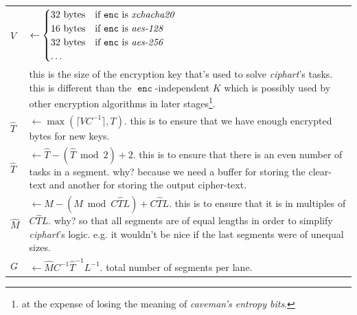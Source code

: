 \documentclass[twocolumn]{article}
\DeclareMathOperator{\enc}{\mathtt{enc}}
\DeclareMathOperator{\maxf}{max}
\begin{document}
\begin{tabularx}{\columnwidth}{lX}
    $V$ & $\gets \begin{cases}
                        32 \text{ bytes} & \text{if $\enc$ is
                                            \emph{xchacha20}}\\
                        16 \text{ bytes} & \text{if $\enc$ is
                            \emph{aes-128}}\\
                        32 \text{ bytes} & \text{if $\enc$ is
                            \emph{aes-256}}\\
                        \ldots & \\
                     \end{cases}$\\
                & this is the size of the encryption key that's used to
                    solve \emph{ciphart}'s tasks.  this is different than
                    the $\enc$-independent $K$ which is
                    possibly used by other encryption algorithms in later
                    stages\footnote{at the expense of losing the meaning of
                    \emph{caveman's entropy bits}.}.\\
    $\hat T$    & $\gets \maxf(\lceil V C^{-1}\rceil, T)$.  this
                    is to ensure that we have enough encrypted bytes for
                    new keys.\\
    $\hat T$    & $\gets \hat T - (\hat T \bmod 2) + 2$.  this is to ensure
                    that there is an even number of tasks in a segment.
                    why?  because we need a buffer for storing the
                    clear-text and another for storing the output
                    cipher-text.\\
    $\hat M$    & $\gets M - (M \bmod C\hat TL) + C\hat TL$.  this is to
                    ensure that it is in multiples of $C\hat TL$.  why?  so
                    that all segments are of equal lengths in order to
                    simplify \emph{ciphart}'s logic.  e.g. it wouldn't be
                    nice if the last segments were of unequal sizes.\\
    $G$         & $\gets \hat MC^{-1}\hat T^{-1}L^{-1}$.  total number of
                    segments per lane.\\
\end{tabularx}
\end{document}
